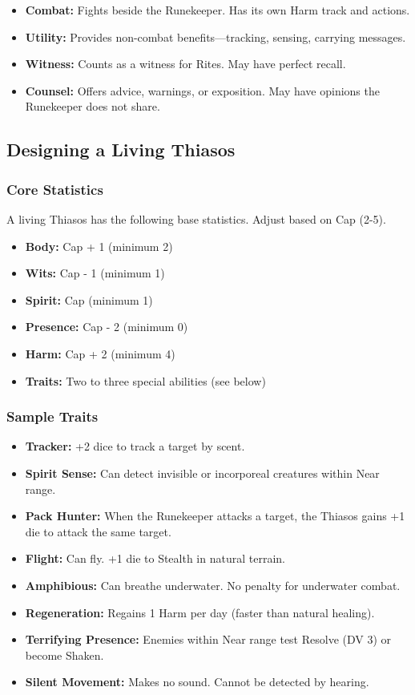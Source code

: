 \begin{itemize}
\item \textbf{Combat:} Fights beside the Runekeeper. Has its own Harm track and actions.
\item \textbf{Utility:} Provides non-combat benefits—tracking, sensing, carrying messages.
\item \textbf{Witness:} Counts as a witness for Rites. May have perfect recall.
\item \textbf{Counsel:} Offers advice, warnings, or exposition. May have opinions the Runekeeper does not share.
\end{itemize}

\subsection{Designing a Living Thiasos}

\subsubsection{Core Statistics}

A living Thiasos has the following base statistics. Adjust based on Cap (2-5).

\begin{itemize}
\item \textbf{Body:} Cap + 1 (minimum 2)
\item \textbf{Wits:} Cap - 1 (minimum 1)
\item \textbf{Spirit:} Cap (minimum 1)
\item \textbf{Presence:} Cap - 2 (minimum 0)
\item \textbf{Harm:} Cap + 2 (minimum 4)
\item \textbf{Traits:} Two to three special abilities (see below)
\end{itemize}

\subsubsection{Sample Traits}

\begin{itemize}
\item \textbf{Tracker:} +2 dice to track a target by scent.
\item \textbf{Spirit Sense:} Can detect invisible or incorporeal creatures within Near range.
\item \textbf{Pack Hunter:} When the Runekeeper attacks a target, the Thiasos gains +1 die to attack the same target.
\item \textbf{Flight:} Can fly. +1 die to Stealth in natural terrain.
\item \textbf{Amphibious:} Can breathe underwater. No penalty for underwater combat.
\item \textbf{Regeneration:} Regains 1 Harm per day (faster than natural healing).
\item \textbf{Terrifying Presence:} Enemies within Near range test Resolve (DV 3) or become Shaken.
\item \textbf{Silent Movement:} Makes no sound. Cannot be detected by hearing.
\end{itemize}

